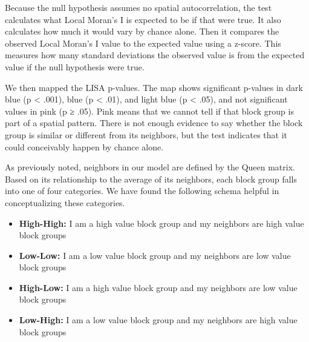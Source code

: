 \documentclass[
  12pt,
]{article}
\newenvironment{Shaded}{\begin{snugshade}}{\end{snugshade}}
\newcommand{\AttributeTok}[1]{\textcolor[rgb]{0.13,0.29,0.53}{#1}}
\newcommand{\ConstantTok}[1]{\textcolor[rgb]{0.56,0.35,0.01}{#1}}
\newcommand{\FunctionTok}[1]{\textcolor[rgb]{0.13,0.29,0.53}{\textbf{#1}}}
\newcommand{\NormalTok}[1]{#1}
\newcommand{\OtherTok}[1]{\textcolor[rgb]{0.56,0.35,0.01}{#1}}
\newcommand{\SpecialCharTok}[1]{\textcolor[rgb]{0.81,0.36,0.00}{\textbf{#1}}}
\newcommand{\StringTok}[1]{\textcolor[rgb]{0.31,0.60,0.02}{#1}}
\providecommand{\tightlist}{%
  \setlength{\itemsep}{0pt}\setlength{\parskip}{0pt}}
\begin{document}
\begin{Shaded}
\end{Shaded}

Because the null hypothesis assumes no spatial autocorrelation, the test
calculates what Local Moran's I is expected to be if that were true. It
also calculates how much it would vary by chance alone. Then it compares
the observed Local Moran's I value to the expected value using a
z-score. This measures how many standard deviations the observed value
is from the expected value if the null hypothesis were true.

We then mapped the LISA p-values. The map shows significant p-values in
dark blue (p \textless{} .001), blue (p \textless{} .01), and light blue
(p \textless{} .05), and not significant values in pink (p ≥ .05). Pink
means that we cannot tell if that block group is part of a spatial
pattern. There is not enough evidence to say whether the block group is
similar or different from its neighbors, but the test indicates that it
could conceivably happen by chance alone.

As previously noted, neighbors in our model are defined by the Queen
matrix. Based on its relationship to the average of its neighbors, each
block group falls into one of four categories. We have found the
following schema helpful in conceptualizing these categories.

\begin{itemize}
\tightlist
\item
  \textbf{High-High:} I am a high value block group and my neighbors are
  high value block groups
\item
  \textbf{Low-Low:} I am a low value block group and my neighbors are
  low value block groups
\item
  \textbf{High-Low:} I am a high value block group and my neighbors are
  low value block groups
\item
  \textbf{Low-High:} I am a low value block group and my neighbors are
  high value block groups
\end{itemize}
\end{document}
